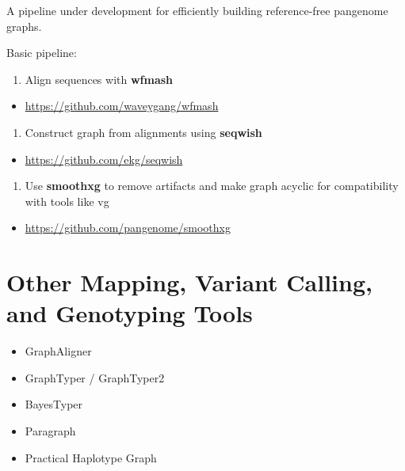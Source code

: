 \documentclass[
]{book}
\providecommand{\tightlist}{%
  \setlength{\itemsep}{0pt}\setlength{\parskip}{0pt}}
\begin{document}
A pipeline under development for efficiently building reference-free pangenome graphs.

Basic pipeline:

\begin{enumerate}
\def\labelenumi{\arabic{enumi}.}
\tightlist
\item
  Align sequences with \textbf{wfmash}
\end{enumerate}

\begin{itemize}
\tightlist
\item
  \url{https://github.com/waveygang/wfmash}
\end{itemize}

\begin{enumerate}
\def\labelenumi{\arabic{enumi}.}
\setcounter{enumi}{1}
\tightlist
\item
  Construct graph from alignments using \textbf{seqwish}
\end{enumerate}

\begin{itemize}
\tightlist
\item
  \url{https://github.com/ekg/seqwish}
\end{itemize}

\begin{enumerate}
\def\labelenumi{\arabic{enumi}.}
\setcounter{enumi}{2}
\tightlist
\item
  Use \textbf{smoothxg} to remove artifacts and make graph acyclic for
  compatibility with tools like vg
\end{enumerate}

\begin{itemize}
\tightlist
\item
  \url{https://github.com/pangenome/smoothxg}
\end{itemize}

\hypertarget{other-mapping-variant-calling-and-genotyping-tools}{%
\section{Other Mapping, Variant Calling, and Genotyping Tools}\label{other-mapping-variant-calling-and-genotyping-tools}}

\begin{itemize}
\tightlist
\item
  GraphAligner
\item
  GraphTyper / GraphTyper2
\item
  BayesTyper
\item
  Paragraph
\item
  Practical Haplotype Graph
\end{itemize}
\end{document}
